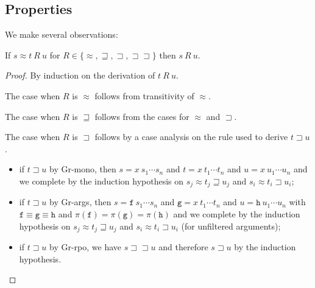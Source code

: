 \documentclass[a4paper,USenglish,cleveref,autoref,thm-restate]{lipics-v2021}
\newcommand{\grmain}{\sqsupset}
\newcommand{\geqmain}{\sqsupseteq}
\newcommand{\ismain}{\approx}
\newcommand{\rpomain}{\sqsupset\!\!\sqsupset}
\newcommand{\eqpred}{\equiv}
\newcommand{\symb}[1]{\mathtt{#1}}
\newcommand{\afun}{\symb{f}}
\newcommand{\bfun}{\symb{g}}
\newcommand{\cfun}{\symb{h}}
\newcommand{\filter}{\pi}
\begin{document}
\subsection{Properties}

We make several observations:

\begin{lemma}\label{lem:compatibility}
If $s \ismain t\ R\ u$ for $R \in \{\ismain,\geqmain,\grmain,\rpomain\}$ then $s\ R\ u$.
\end{lemma}

\begin{proof}
By induction on the derivation of $t\ R\ u$.

The case when $R$ is $\ismain$ follows from transitivity of $\ismain$.

The case when $R$ is $\geqmain$ follows from the cases for $\ismain$ and $\grmain$.

The case when $R$ is $\grmain$ follows by a case analysis on the rule used to derive $t \grmain u$.
\begin{itemize}
\item if $t \grmain u$ by Gr-mono, then $s = x\ s_1 \cdots s_n$ and $t = x\ t_1 \cdots t_n$ and
  $u = x\ u_1 \cdots u_n$ and we complete by the induction hypothesis on $s_j \ismain t_j \geqmain
  u_j$ and $s_i \ismain t_i \grmain u_i$;
\item if $t \grmain u$ by Gr-args, then $s = \afun\ s_1 \cdots s_n$ and $\bfun = x\ t_1 \cdots t_n$
  and $u = \cfun\ u_1 \cdots u_n$ with $\afun \eqpred \bfun \eqpred \cfun$ and $\filter(\afun) =
  \filter(\bfun) = \filter(\cfun)$ and we complete by the induction hypothesis on $s_j \ismain t_j
  \geqmain u_j$ and $s_i \ismain t_i \grmain u_i$ (for unfiltered arguments);
\item if $t \grmain u$ by Gr-rpo, we have $s \rpomain u$ and therefore $s \grmain u$ by the
  induction hypothesis.
\end{itemize}


\end{proof}
\end{document}
